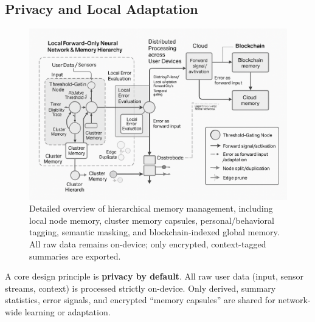 \documentclass[11pt]{article}
\begin{document}
\subsection{Privacy and Local Adaptation}

\begin{figure}[ht]
    \centering
    \includegraphics[width=0.63\linewidth]{architecture_diagrams/bbe6c593-355f-42f7-a0a1-79f3937b8efa.png}
    \caption{
        Detailed overview of hierarchical memory management, including local node memory, cluster memory capsules, personal/behavioral tagging, semantic masking, and blockchain-indexed global memory. All raw data remains on-device; only encrypted, context-tagged summaries are exported.
    }
    \label{fig:overview-mem-management}
\end{figure}

A core design principle is \textbf{privacy by default}. All raw user data (input, sensor streams, context) is processed strictly on-device. Only derived, summary statistics, error signals, and encrypted “memory capsules” are shared for network-wide learning or adaptation.
\end{document}
